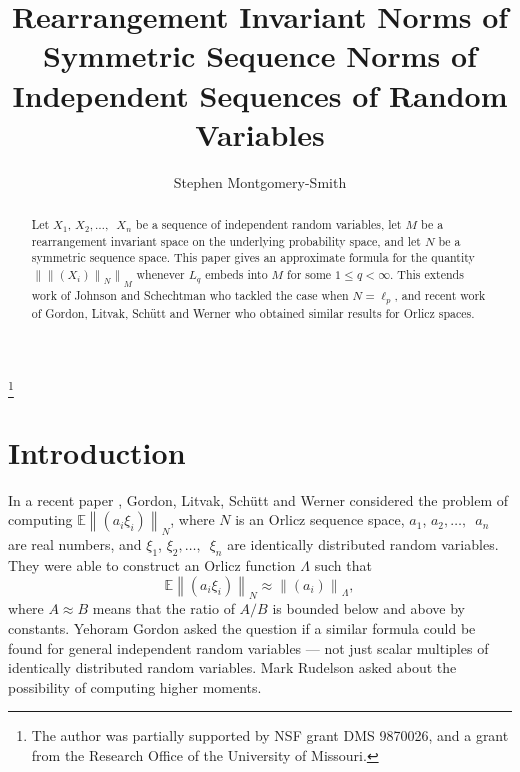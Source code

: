 \documentclass[12pt]{amsart}
\newcommand{\E}{{\mathbb E}}
\newcommand{\normo}[1]{{\left\|#1\right\|}}
\newcommand{\snormo}[1]{{\mathopen\|#1\mathclose\|}}
\begin{document}
\title[R.i. norms of symmetric sequence norms]
{Rearrangement Invariant Norms of Symmetric Sequence Norms
of Independent Sequences of Random Variables
}

\author{Stephen Montgomery-Smith}
\makeatletter
\address{Department of Mathematics\\
University of Missouri\\
Columbia, MO 65211}
\thanks{The author was 
partially supported
by NSF grant DMS 9870026, and a grant from the Research Office of the
University of Missouri.}

\begin{abstract}
\noindent
Let $X_1$, $X_2,\dots,$\ $X_n$ be a sequence of independent random
variables, let $M$ be a rearrangement invariant space on the underlying
probability space, and let $N$ be a symmetric sequence space.  
This paper
gives an approximate formula for the quantity
$\snormo{\snormo{(X_i)}_N}_M$ whenever $L_q$ embeds into $M$ for some
$1 \le q < \infty$.
This extends work of Johnson and Schechtman who tackled the case when
$N = \ell_p$, and
recent work of Gordon, Litvak, Sch\"utt and Werner who obtained
similar results for Orlicz spaces.
\end{abstract}

\maketitle

\section{Introduction}

In a recent paper \cite{gordon et al}, Gordon, Litvak, Sch\"utt and Werner
considered the problem of computing $\E \normo{(a_i \xi_i)}_N$, where
$N$ is an Orlicz sequence space, $a_1$, $a_2,\dots,$\ $a_n$ are real numbers, 
and $\xi_1$, $\xi_2,\dots,$\ $\xi_n$ are identically distributed random 
variables.  
They were able to construct an Orlicz function $\Lambda$ such
that 
\[ 
   \E \normo{(a_i \xi_i)}_N \approx \snormo{(a_i)}_\Lambda ,
\]
where $A \approx B$ means that the ratio of $A/B$ is bounded below
and above by constants.  
Yehoram Gordon asked the question if a similar
formula could be found for general independent random variables --- 
not just scalar multiples of identically distributed random variables.
Mark Rudelson asked about the possibility of computing higher moments.
\end{document}
